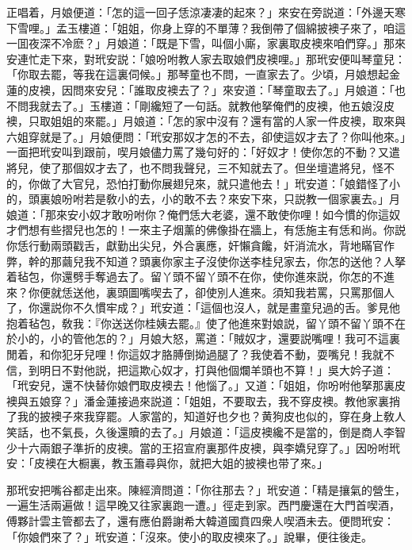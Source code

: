 正唱着，月娘便道：「怎的這一回子恁涼凄凄的起來？」來安在旁説道：「外邊天寒下雪哩。」孟玉樓道：「姐姐，你身上穿的不單薄？我倒帶了個綿披襖子來了，咱這一囬夜深不冷麽？」月娘道：「既是下雪，叫個小廝，家裏取皮襖來咱們穿。」那來安連忙走下來，對玳安説：「娘吩咐教人家去取娘們皮襖哩。」那玳安便叫琴童兒：「你取去罷，等我在這裏伺候。」那琴童也不問，一直家去了。少頃，月娘想起金蓮的皮襖，因問來安兒：「誰取皮襖去了？」來安道：「琴童取去了。」月娘道：「也不問我就去了。」玉樓道：「剛纔短了一句話。就教他拏俺們的皮襖，他五娘沒皮襖，只取姐姐的來罷。」月娘道：「怎的家中沒有？還有當的人家一件皮襖，取來與六姐穿就是了。」月娘便問：「玳安那奴才怎的不去，卻使這奴才去了？你叫他來。」一面把玳安叫到跟前，喫月娘儘力罵了幾句好的：「好奴才！使你怎的不動？又遣將兒，使了那個奴才去了，也不問我聲兒，三不知就去了。但坐壇遣將兒，怪不的，你做了大官兒，恐怕打動你展翅兒來，就只遣他去！」玳安道：「娘錯怪了小的，頭裏娘吩咐若是敎小的去，小的敢不去？來安下來，只説教一個家裏去。」月娘道：「那來安小奴才敢吩咐你？俺們恁大老婆，還不敢使你哩！如今慣的你這奴才們想有些摺兒也怎的！一來主子烟薰的佛像掛在牆上，有恁施主有恁和尚。你説你恁行動兩頭戳舌，獻勤出尖兒，外合裏應，奸懶貪饞，奸消流水，背地瞞官作弊，幹的那繭兒我不知道？頭裏你家主子沒使你送李桂兒家去，你怎的送他？人拏着毡包，你還劈手奪過去了。留丫頭不留丫頭不在你，使你進來説，你怎的不進來？你便就恁送他，裏頭圖嘴喫去了，卻使別人進來。須知我若罵，只罵那個人了，你還説你不久慣牢成？」玳安道：「這個也沒人，就是畫童兒過的舌。爹見他抱着毡包，敎我：『你送送你桂姨去罷。』使了他進來對娘説，留丫頭不留丫頭不在於小的，小的管他怎的？」月娘大怒，罵道：「賊奴才，還要説嘴哩！我可不這裏閒着，和你犯牙兒哩！你這奴才胳膊倒拗過腿了？我使着不動，耍嘴兒！我就不信，到明日不對他説，把這欺心奴才，打與他個爛羊頭也不算！」吳大妗子道：「玳安兒，還不快替你娘們取皮襖去！他惱了。」又道：「姐姐，你吩咐他拏那裏皮襖與五娘穿？」潘金蓮接過來説道：「姐姐，不要取去，我不穿皮襖。教他家裏捎了我的披襖子來我穿罷。人家當的，知道好也夕也？黄狗皮也似的，穿在身上敎人笑話，也不氣長，久後還贖的去了。」月娘道：「這皮襖纔不是當的，倒是商人李智少十六兩銀子準折的皮襖。當的王招宣府裏那件皮襖，與李嬌兒穿了。」因吩咐玳安：「皮襖在大橱裏，教玉簫尋與你，就把大姐的披襖也带了來。」

那玳安把嘴谷都走出來。陳經濟問道：「你往那去？」玳安道：「精是攘氣的營生，一遍生活兩遍做！這早晚又往家裏跑一遭。」徑走到家。西門慶還在大門首喫酒，傅夥計雲主管都去了，還有應伯爵謝希大韓道國賁四衆人喫酒未去。便問玳安：「你娘們來了？」玳安道：「沒來。使小的取皮襖來了。」說畢，便往後走。

